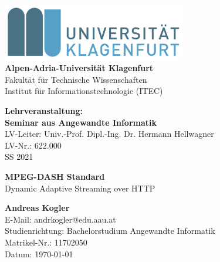 \documentclass[paper = a4, fontsize = 12pt, parskip = half]{scrartcl} %
\begin{document}

\begin{titlepage}

    \begin{center}
        \includegraphics[width=8cm]{images/logo_aau.png} \\
        \vspace{8mm}
        \huge\textbf{Alpen-Adria-Universität Klagenfurt} \\
        \vspace{3mm}
        Fakultät für Technische Wissenschaften \\
        \vspace{3mm}
        Institut für Informationstechnologie (ITEC)\\
        \vspace{3mm}
    \end{center}
    
    \vspace{5mm}
    
    \begin{center}
        \textbf{Lehrveranstaltung: \\
            Seminar aus Angewandte Informatik} \\
        \vspace{2mm}
        LV-Leiter: Univ.-Prof. Dipl.-Ing. Dr. Hermann Hellwagner \\
        LV-Nr.: 622.000 \\
        SS 2021
    \end{center}
    
    \vspace{15mm}
    
    \begin{center}
        \Large\textbf{MPEG-DASH Standard} \\
        \vspace{2mm}
        \normalsize Dynamic Adaptive Streaming over HTTP
    \end{center}
    
    \vspace{40mm}
    
    \begin{flushleft}
        \textbf{Andreas Kogler} \\
        E-Mail: andrkogler@edu.aau.at \\
        Studienrichtung: Bachelorstudium Angewandte Informatik \\
        Matrikel-Nr.: 11702050\\
        Datum: \today
    \end{flushleft}
    
\end{titlepage}
\end{document}
